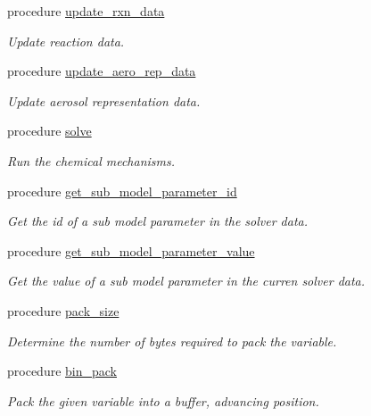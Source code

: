 \begin{DoxyCompactItemize}
procedure \mbox{\hyperlink{structpmc__phlex__core_1_1phlex__core__t_a22661f84116d1647c07c4d0386774c3c}{update\+\_\+rxn\+\_\+data}}
\begin{DoxyCompactList}\small\item\em Update reaction data. \end{DoxyCompactList}\item 
procedure \mbox{\hyperlink{structpmc__phlex__core_1_1phlex__core__t_a6b93bd7d31b9d871a90026432a468cc0}{update\+\_\+aero\+\_\+rep\+\_\+data}}
\begin{DoxyCompactList}\small\item\em Update aerosol representation data. \end{DoxyCompactList}\item 
procedure \mbox{\hyperlink{structpmc__phlex__core_1_1phlex__core__t_af0904c4e6ce9e56cb932e06a6fe4066f}{solve}}
\begin{DoxyCompactList}\small\item\em Run the chemical mechanisms. \end{DoxyCompactList}\item 
procedure \mbox{\hyperlink{structpmc__phlex__core_1_1phlex__core__t_a4a17776c07fd331d333e7788236a83c2}{get\+\_\+sub\+\_\+model\+\_\+parameter\+\_\+id}}
\begin{DoxyCompactList}\small\item\em Get the id of a sub model parameter in the solver data. \end{DoxyCompactList}\item 
procedure \mbox{\hyperlink{structpmc__phlex__core_1_1phlex__core__t_a919d9a8850cd097cc6c167c52ea237ff}{get\+\_\+sub\+\_\+model\+\_\+parameter\+\_\+value}}
\begin{DoxyCompactList}\small\item\em Get the value of a sub model parameter in the curren solver data. \end{DoxyCompactList}\item 
procedure \mbox{\hyperlink{structpmc__phlex__core_1_1phlex__core__t_aaa3fbf2d93bc6c6dac0879bba28a096f}{pack\+\_\+size}}
\begin{DoxyCompactList}\small\item\em Determine the number of bytes required to pack the variable. \end{DoxyCompactList}\item 
procedure \mbox{\hyperlink{structpmc__phlex__core_1_1phlex__core__t_adbfecab3c96bf77b78da1741dc966542}{bin\+\_\+pack}}
\begin{DoxyCompactList}\small\item\em Pack the given variable into a buffer, advancing position. \end{DoxyCompactList}\item 

\end{DoxyCompactItemize}
